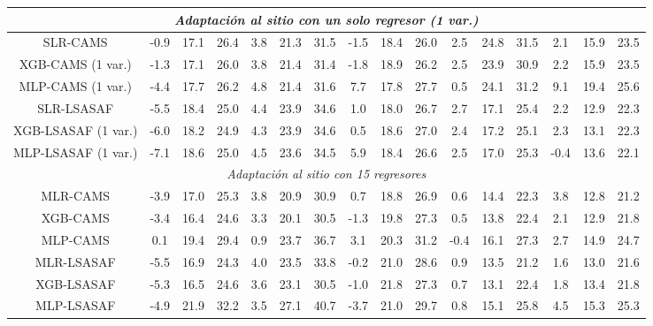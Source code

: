 \begin{table}
{\begin{tabular}{cccccccccccccccc}
\multicolumn{16}{|c|}{\textit{Adaptación al sitio con un solo regresor (1 var.)}} \\
\hline
SLR-CAMS    & -0.9 & 17.1 & 26.4 &  3.8 & 21.3 & 31.5 & -1.5 & 18.4 & 26.0 &  2.5 & 24.8 & 31.5 &  2.1 & 15.9 & 23.5 \\
XGB-CAMS (1 var.) & -1.3 & 17.1 & 26.0 &  3.8 & 21.4 & 31.4 & -1.8 & 18.9 & 26.2 &  2.5 & 23.9 & 30.9 &  2.2 & 15.9 & 23.5 \\
MLP-CAMS (1 var.) & -4.4 & 17.7 & 26.2 &  4.8 & 21.4 & 31.6 &  7.7 & 17.8 & 27.7 &  0.5 & 24.1 & 31.2 &  9.1 & 19.4 & 25.6 \\
SLR-LSASAF  & -5.5 & 18.4 & 25.0 &  4.4 & 23.9 & 34.6 &  1.0 & 18.0 & 26.7 &  2.7 & 17.1 & 25.4 &  2.2 & 12.9 & 22.3 \\
XGB-LSASAF (1 var.) & -6.0 & 18.2 & 24.9 &  4.3 & 23.9 & 34.6 &  0.5 & 18.6 & 27.0 &  2.4 & 17.2 & 25.1 &  2.3 & 13.1 & 22.3 \\
MLP-LSASAF (1 var.) & -7.1 & 18.6 & 25.0 &  4.5 & 23.6 & 34.5 &  5.9 & 18.4 & 26.6 &  2.5 & 17.0 & 25.3 & -0.4 & 13.6 & 22.1 \\
\hline
\multicolumn{16}{|c|}{\textit{Adaptación al sitio con 15 regresores}} \\
\hline
MLR-CAMS    & -3.9 & 17.0 & 25.3 &  3.8 & 20.9 & 30.9 &  0.7 & 18.8 & 26.9 &  0.6 & 14.4 & 22.3 &  3.8 & 12.8 & 21.2 \\
XGB-CAMS    & -3.4 & 16.4 & 24.6 &  3.3 & 20.1 & 30.5 & -1.3 & 19.8 & 27.3 &  0.5 & 13.8 & 22.4 &  2.1 & 12.9 & 21.8 \\
MLP-CAMS    &  0.1 & 19.4 & 29.4 &  0.9 & 23.7 & 36.7 &  3.1 & 20.3 & 31.2 & -0.4 & 16.1 & 27.3 &  2.7 & 14.9 & 24.7 \\
MLR-LSASAF  & -5.5 & 16.9 & 24.3 &  4.0 & 23.5 & 33.8 & -0.2 & 21.0 & 28.6 &  0.9 & 13.5 & 21.2 &  1.6 & 13.0 & 21.6 \\
XGB-LSASAF  & -5.3 & 16.5 & 24.6 &  3.6 & 23.1 & 30.5 & -1.0 & 21.8 & 27.3 &  0.7 & 13.1 & 22.4 &  1.8 & 13.4 & 21.8 \\
MLP-LSASAF  & -4.9 & 21.9 & 32.2 &  3.5 & 27.1 & 40.7 & -3.7 & 21.0 & 29.7 &  0.8 & 15.1 & 25.8 &  4.5 & 15.3 & 25.3 \\
\hline
\end{tabular}}
\end{table}


